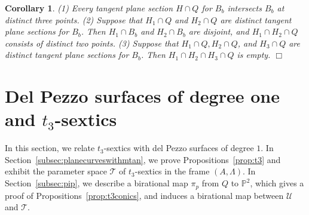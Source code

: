 \documentclass{math}
\theoremstyle{plain}
\newtheorem{corollary}[theorem]{Corollary}
\newtheorem{remark}[theorem]{Remark}
\numberwithin{equation}{section}
\newcommand{\qed}{\hfill {$\Box$}}
\newcommand{\PP}{\mathord{\mathbb  P}}
\newcommand{\TTT}{\mathord{\mathcal T}}
\newcommand{\UUU}{\mathord{\mathcal U}}
\newcommand{\mtan}[1]{t_{#1}}
\begin{document}
%
%
\begin{corollary}\label{cor:general1}
{\rm (1)}
Every tangent plane section $H\cap Q$  for $B_b$ intersects $B_b$ at distinct  three  points.
{\rm (2)} 
Suppose that  $H_1\cap Q$ and $H_2\cap Q$ are distinct  tangent plane sections for $B_b$.
Then  $H_1\cap B_b$ and $ H_2\cap B_b$ are disjoint, 
 and  $H_1\cap H_2\cap Q$ consists of distinct two points.
 {\rm (3)} 
 Suppose that  $H_1\cap Q, H_2\cap Q$, and $H_3\cap Q$ are distinct  tangent plane sections for $B_b$.
Then   $H_1\cap H_2\cap H_3 \cap Q$ is empty.
\qed
\end{corollary}
%
%
%
%
%
\section{Del Pezzo surfaces of degree one and \texorpdfstring{$\mtan{3}$}{mtan3}-sextics}\label{sec:mtan3anddelPezzo}
%
In this section,
we relate  $\mtan{3}$-sextics
with del Pezzo surfaces of degree $1$.
In Section~\ref{subsec:planecurveswithmtan},
we prove Propositions~\ref{prop:t3}
and exhibit the parameter space $\TTT$
of $\mtan{3}$-sextics in the frame $(A, \Lambda)$.
In Section~\ref{subsec:pip},
we describe a birational map $\pi_p$ from 
$Q$ to $\PP^2$,
which gives a proof of Propositions~\ref{prop:t3conics},
and induces a birational map between $\UUU$ and $\TTT$.
%
\end{document}
